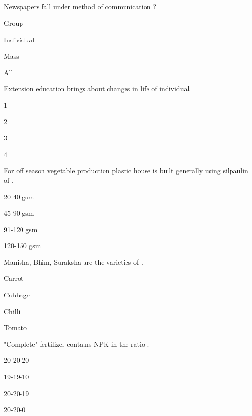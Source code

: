 
\subsection*{}

\begin{questions}

\question Newspapers fall under \fillin[][3cm] method of communication ?
\begin{items}
\item Group
\item Individual
\item* Mass
\item All
\end{items}

\question Extension education brings about \fillin[][3cm] changes in life of individual.
\begin{items}
\item 1
\item 2
\item* 3
\item 4
\end{items}

\question For off season vegetable production plastic house is built generally using silpaulin of \fillin[][3cm].
\begin{items}
\item 20-40 gsm
\item* 45-90 gsm
\item 91-120 gsm
\item 120-150 gsm
\end{items}

\question Manisha, Bhim, Suraksha are the varieties of \fillin[][3cm].
\begin{items}
\item Carrot
\item Cabbage
\item Chilli
\item* Tomato
\end{items}

\question "Complete" fertilizer contains NPK in the ratio \fillin[][3cm].
\begin{items}
\item 20-20-20
\item* 19-19-10
\item 20-20-19
\item 20-20-0
\end{items}


\end{questions}
